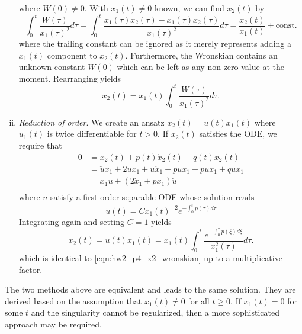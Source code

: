 \begin{enumerate}[(i)]
{\begin{equation}
    \end{equation}
    where $W(0) \neq 0$. 
    With $x_1(t) \neq 0$ known, we can find $x_2(t)$ by 
    \begin{equation}
        \int_0^t \frac{W(\tau)}{{x_1(\tau)}^2} d\tau = \int_0^t \frac{x_1(\tau) \dot{x}_2(\tau) - \dot{x}_1(\tau) x_2(\tau)}{{x_1(\tau)}^2} d\tau = \frac{x_2(t)}{x_1(t)} + \textrm{const.}
    \end{equation}
    where the trailing constant can be ignored as it merely represents adding a $x_1(t)$ component to $x_2(t)$. 
    Furthermore, the Wronskian contains an unknown constant $W(0)$ which can be left as any non-zero value at the moment. 
    Rearranging yields 
    \begin{equation}\label{eqn:hw2_p4_x2_wronskian}
        \boxed{x_2(t) = x_1(t) \int_0^t \frac{W(\tau)}{{x_1(\tau)}^2} d\tau}.
    \end{equation}
}
\item {
    \emph{Reduction of order}. We create an ansatz $x_2(t) = u(t)x_1(t)$ where $u_1(t)$ is twice differentiable for $t > 0$. 
    If $x_2(t)$ satisfies the ODE, we require that 
    \begin{equation}
    \begin{aligned}
        0 & = \ddot{x}_2(t) + p(t) \dot{x}_2(t) + q(t) x_2(t) \\
        &= \ddot{u}x_1 + 2\dot{u}\dot{x}_1 + u \ddot{x}_1 + p\dot{u}x_1 + pu\dot{x}_1 + q ux_1 \\
        &= x_1\ddot{u} + (2\dot{x}_1 + px_1) \dot{u}\\
    \end{aligned}
    \end{equation}
    where $\dot{u}$ satisfy a first-order separable ODE whose solution reads 
    \begin{equation}
        \dot{u}(t) = C {x_1(t)}^{-2} e^{-\int_0^t p(\tau) d\tau}
    \end{equation}
    Integrating again and setting $C = 1$ yields 
    \begin{equation}
        \boxed{x_2(t) = u(t) x_1(t) = x_1(t) \int_0^t \frac{e^{-\int_0^\tau p(\xi) d\xi}}{x_1^2(\tau)} d\tau}.
    \end{equation}
    which is identical to \cref{eqn:hw2_p4_x2_wronskian} up to a multiplicative factor. 
}
\end{enumerate}

The two methods above are equivalent and leads to the same solution. 
They are derived based on the assumption that $x_1(t) \neq 0$ for all $t \geq 0$.
If $x_1(t) = 0$ for some $t$ and the singularity cannot be regularized, then a more sophisticated approach may be required. 

